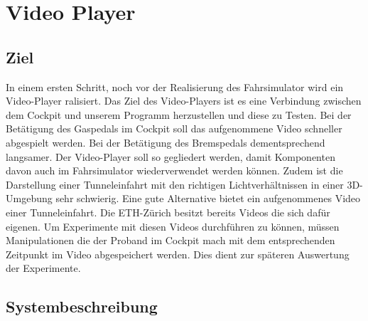 \section{Video Player}
\subsection{Ziel}
In einem ersten Schritt, noch vor der Realisierung des Fahrsimulator wird ein Video-Player ralisiert. Das Ziel des Video-Players ist es eine Verbindung zwischen dem Cockpit und unserem Programm herzustellen und diese zu Testen. Bei der Betätigung des Gaspedals im Cockpit soll das aufgenommene Video schneller abgespielt werden. Bei der Betätigung des Bremspedals dementsprechend langsamer. Der Video-Player soll so gegliedert werden, damit Komponenten davon auch im Fahrsimulator wiederverwendet werden können. Zudem ist die Darstellung einer Tunneleinfahrt mit den richtigen Lichtverhältnissen in einer 3D-Umgebung sehr schwierig. Eine gute Alternative bietet ein aufgenommenes Video einer Tunneleinfahrt. Die ETH-Zürich besitzt bereits Videos die sich dafür eigenen. Um Experimente mit diesen Videos durchführen zu können, müssen Manipulationen die der Proband im Cockpit mach mit dem entsprechenden Zeitpunkt im Video abgespeichert werden. Dies dient zur späteren Auswertung der Experimente. 
\\
\subsection{Systembeschreibung}

